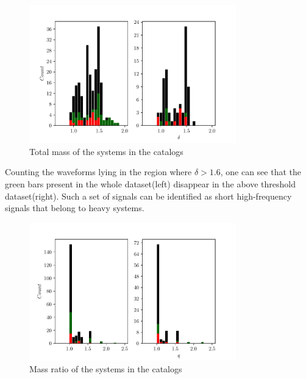\begin{figure}[hbt!]
\begin{center}
\includegraphics[width=0.8\textwidth, angle=0]{images/Data_analysis/results/alpha_deltahist.pdf}
\caption{Total mass of the systems in the catalogs}
\label{adelhist}
\end{center}
\end{figure}

Counting the waveforms lying in the region where $\delta>1.6$, one can see that the green bars present in the whole dataset(left) disappear in the above threshold dataset(right). Such a set of signals can be identified as short high-frequency signals that belong to heavy systems. 

\begin{figure}[hbt!]
\begin{center}
\includegraphics[width=0.8\textwidth, angle=0]{images/Data_analysis/results/alpha_qhist.pdf}
\caption{Mass ratio of the systems in the catalogs}
\label{aqhist}
\end{center}
\end{figure}

